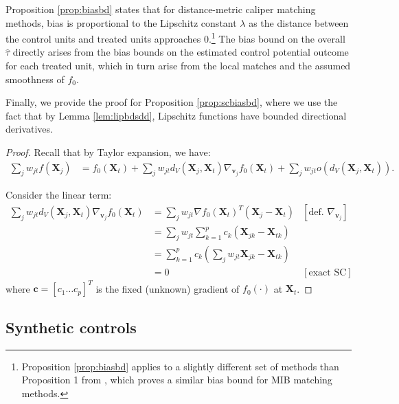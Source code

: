 \documentclass{article}
\newcommand{\Xt}{\mathbf{X}_t}
\newcommand{\Xj}{\mathbf{X}_j}
\newcommand{\vj}{\mathbf{v}_j}
\begin{document}
Proposition \ref{prop:biasbd} states that for distance-metric caliper matching methods, bias is proportional to the Lipschitz constant $\lambda$ as the distance between the control units and treated units approaches 0.\footnote{Proposition \ref{prop:biasbd} applies to a slightly different set of methods than Proposition 1 from \citet{iacus2011multivariate}, which proves a similar bias bound for MIB matching methods.}
The bias bound on the overall $\hat{\tau}$ directly arises from the bias bounds on the estimated control potential outcome for each treated unit, 
which in turn arise from the local matches and the assumed smoothness of $f_0$.

Finally, we provide the proof for Proposition \ref{prop:scbiasbd},
where we use the fact that by Lemma \ref{lem:lipbdsdd}, Lipschitz functions have bounded directional derivatives.
\begin{proof}
    Recall that by Taylor expansion, we have:
    \begin{align*}
        \sum_j w_{jt} f(\Xj)
        &= f_0(\Xt) + \sum_j w_{jt} d_V(\Xj, \Xt) \nabla_{\vj} f_0(\Xt) + \sum_j w_{jt} o(d_V(\Xj, \Xt)).
    \end{align*}
    
    Consider the linear term:
    \begin{align*}
        \sum_j w_{jt}  d_V(\Xj, \Xt) \nabla_{\vj} f_0(\Xt)
        &= \sum_j w_{jt} \nabla f_0(\Xt)^T (\Xj - \Xt) &[\text{def. } \nabla_{\vj}]\\
        &= \sum_j w_{jt} \sum_{k=1}^p c_k (\mathbf{X}_{jk} - \mathbf{X}_{tk}) \\
        &= \sum_{k=1}^p c_k (\sum_j w_{jt} \mathbf{X}_{jk} - \mathbf{X}_{tk}) \\
        &= 0 &[\text{exact SC}]
    \end{align*}
    where $\mathbf{c} = [c_1 \dots c_p]^T$ is the fixed (unknown) gradient of $f_0(\cdot)$ at $\Xt$.
\end{proof}



\subsection{Synthetic controls}
\label{app:scm}
\end{document}
